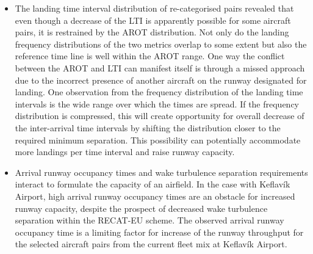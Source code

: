 \begin{itemize}
    \item The landing time interval distribution of re-categorised pairs revealed that even though a decrease of the LTI is apparently possible for some aircraft pairs, it is restrained by the AROT distribution. Not only do the landing frequency distributions of the two metrics overlap to some extent but also the reference time line is well within the AROT range. One way the conflict between the AROT and LTI can manifest itself is through a missed approach due to the incorrect presence of another aircraft on the runway designated for landing. One observation from the frequency distribution of the landing time intervals is the wide range over which the times are spread. If the frequency distribution is compressed, this will create opportunity for overall decrease of the inter-arrival time intervals by shifting the distribution closer to the required minimum separation. This possibility can potentially accommodate more landings per time interval and raise runway capacity.
    
    \item Arrival runway occupancy times and wake turbulence separation requirements interact to formulate the capacity of an airfield. In the case with Keflavík Airport, high arrival runway occupancy times are an obstacle for increased runway capacity, despite the prospect of decreased wake turbulence separation within the RECAT-EU scheme. The observed arrival runway occupancy time is a limiting factor for increase of the runway throughput for the selected aircraft pairs from the current fleet mix at Keflavík Airport.
    
    
    
\end{itemize}




